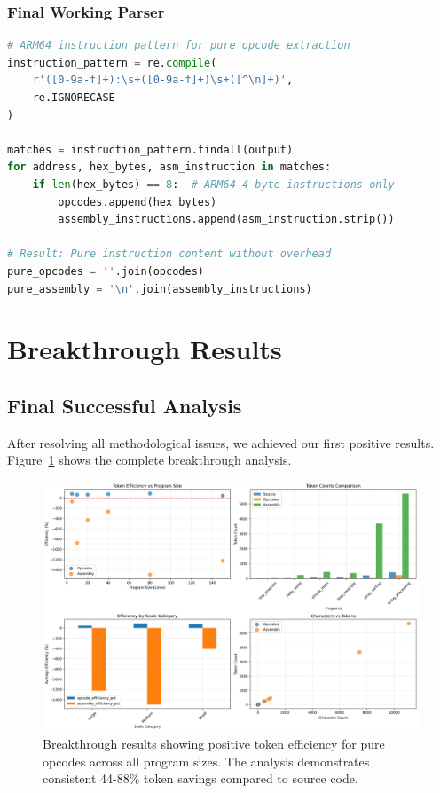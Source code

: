 \documentclass[11pt,a4paper]{article}
\begin{document}
\subsubsection{Final Working Parser}
\begin{lstlisting}[language=python, caption=Successful instruction extraction methodology]
# ARM64 instruction pattern for pure opcode extraction
instruction_pattern = re.compile(
    r'([0-9a-f]+):\s+([0-9a-f]+)\s+([^\n]+)', 
    re.IGNORECASE
)

matches = instruction_pattern.findall(output)
for address, hex_bytes, asm_instruction in matches:
    if len(hex_bytes) == 8:  # ARM64 4-byte instructions only
        opcodes.append(hex_bytes)
        assembly_instructions.append(asm_instruction.strip())

# Result: Pure instruction content without overhead
pure_opcodes = ''.join(opcodes)
pure_assembly = '\n'.join(assembly_instructions)
\end{lstlisting}

\section{Breakthrough Results}

\subsection{Final Successful Analysis}
After resolving all methodological issues, we achieved our first positive results. Figure~\ref{fig:working_results} shows the complete breakthrough analysis.

\begin{figure}[H]
\centering
\includegraphics[width=\textwidth]{working_analysis_results.png}
\caption{Breakthrough results showing positive token efficiency for pure opcodes across all program sizes. The analysis demonstrates consistent 44-88\% token savings compared to source code.}
\label{fig:working_results}
\end{figure}
\end{document}
